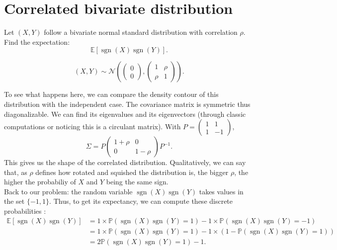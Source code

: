 \section{Correlated bivariate distribution}

\begin{tcolorbox}[width=\linewidth, sharp corners=all, colback=white!95!black]
Let $(X,Y)$ follow a bivariate normal standard distribution with correlation $\rho$. Find the expectation: $$\mathbb{E}[\operatorname{sgn}(X)\operatorname{sgn}(Y)].$$
\end{tcolorbox}

$$(X,Y) \sim \mathcal{N}\left(\begin{pmatrix}0\\0\end{pmatrix}, \begin{pmatrix}
1 & \rho\\ \rho & 1
\end{pmatrix}\right).$$

To see what happens here, we can compare the density contour of this distribution with the independent case. The covariance matrix is symmetric thus diagonalizable. We can find its eigenvalues and its eigenvectors (through classic computations or noticing this is a circulant matrix). With $P = \begin{pmatrix}
1 & 1\\ 1 & -1
\end{pmatrix}$,
$$\Sigma = P\begin{pmatrix}
1+\rho & 0\\ 0 & 1-\rho
\end{pmatrix}P^{-1}.$$
This gives us the shape of the correlated distribution. Qualitatively, we can say that, as $\rho$ defines how rotated and squished the distribution is, the bigger $\rho$, the higher the probabiliy of $X$ and $Y$ being the same sign.\\

Back to our problem: the random variable $\operatorname{sgn}(X)\operatorname{sgn}(Y)$ takes values in the set $\{-1,1\}$. Thus, to get its expectancy, we can compute these discrete probabilities :
\begin{align*}
    \mathbb{E}[\operatorname{sgn}(X)\operatorname{sgn}(Y)] &= 1\times \mathbb{P}(\operatorname{sgn}(X)\operatorname{sgn}(Y)=1) -1\times \mathbb{P}(\operatorname{sgn}(X)\operatorname{sgn}(Y)=-1)\\
    &= 1\times \mathbb{P}(\operatorname{sgn}(X)\operatorname{sgn}(Y)=1) -1\times (1-\mathbb{P}(\operatorname{sgn}(X)\operatorname{sgn}(Y)=1))\\
    &= 2\mathbb{P}(\operatorname{sgn}(X)\operatorname{sgn}(Y)=1) -1.
\end{align*}


